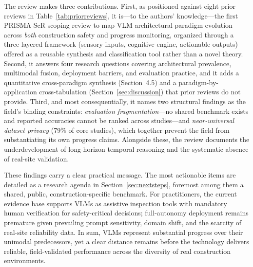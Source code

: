 \documentclass[10pt,letterpaper]{article}
\begin{document}
The review makes three contributions. First, as positioned against eight prior reviews in Table~\ref{tab:priorreviews}, it is---to the authors' knowledge---the first PRISMA-ScR scoping review to map VLM architectural-paradigm evolution across \emph{both} construction safety and progress monitoring, organized through a three-layered framework (sensory inputs, cognitive engine, actionable outputs) offered as a reusable synthesis and classification tool rather than a novel theory. Second, it answers four research questions covering architectural prevalence, multimodal fusion, deployment barriers, and evaluation practice, and it adds a quantitative cross-paradigm synthesis (Section~4.5) and a paradigm-by-application cross-tabulation (Section~\ref{sec:discussion}) that prior reviews do not provide. Third, and most consequentially, it names two structural findings as the field's binding constraints: \emph{evaluation fragmentation}---no shared benchmark exists and reported accuracies cannot be ranked across studies---and \emph{near-universal dataset privacy} (79\% of core studies), which together prevent the field from substantiating its own progress claims. Alongside these, the review documents the underdevelopment of long-horizon temporal reasoning and the systematic absence of real-site validation.

These findings carry a clear practical message. The most actionable items are detailed as a research agenda in Section~\ref{sec:nextsteps}, foremost among them a shared, public, construction-specific benchmark. For practitioners, the current evidence base supports VLMs as assistive inspection tools with mandatory human verification for safety-critical decisions; full-autonomy deployment remains premature given prevailing prompt sensitivity, domain shift, and the scarcity of real-site reliability data. In sum, VLMs represent substantial progress over their unimodal predecessors, yet a clear distance remains before the technology delivers reliable, field-validated performance across the diversity of real construction environments.
\end{document}
